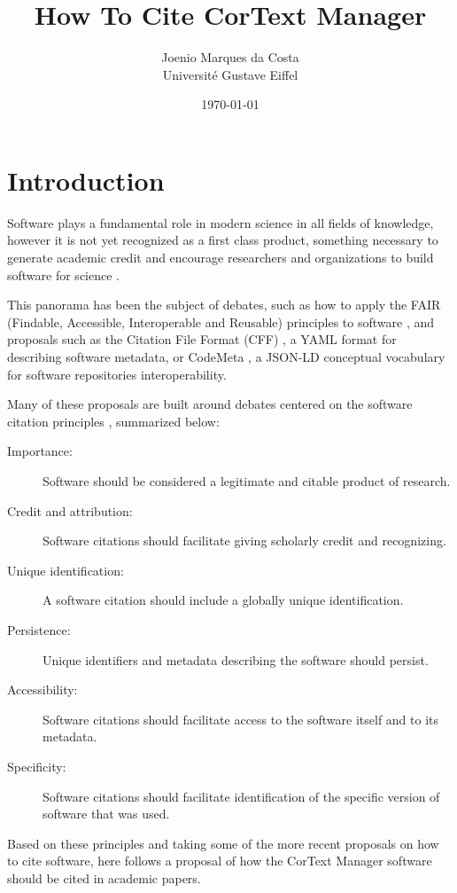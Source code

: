 \documentclass{article}
\title{
  How To Cite CorText Manager
}
\author{
  Joenio Marques da Costa \\
  Université Gustave Eiffel
}
\date{\today}
\begin{document}
\maketitle

\section{Introduction}

Software plays a fundamental role in modern science in all fields of knowledge,
however it is not yet recognized as a first class product, something necessary
to generate academic credit and encourage researchers and organizations to
build software for science  \cite{alliez_attributing_2020}.

This panorama has been the subject of debates, such as how to apply the FAIR
(Findable, Accessible, Interoperable and Reusable) principles to software
\cite{noauthor_fair_nodate}, and proposals such as the Citation File Format
(CFF) \cite{chue_hong_software_2019}, a YAML format for describing software
metadata, or CodeMeta \cite{druskat_citation_2019}, a JSON-LD conceptual
vocabulary for software repositories interoperability.

Many of these proposals are built around debates centered on the software
citation principles \cite{smith_software_2016}, summarized below:

\begin{description}
  \item[Importance:] Software should be considered a legitimate and citable product of research.
  \item[Credit and attribution:] Software citations should facilitate giving scholarly credit and recognizing.
  \item[Unique identification:] A software citation should include a globally unique identification.
  \item[Persistence:] Unique identifiers and metadata describing the software should persist.
  \item[Accessibility:] Software citations should facilitate access to the software itself and to its metadata.
  \item[Specificity:] Software citations should facilitate identification of the specific version of software that was used.
\end{description}

Based on these principles and taking some of the more recent proposals on how
to cite software, here follows a proposal of how the CorText Manager software
should be cited in academic papers.
\end{document}
